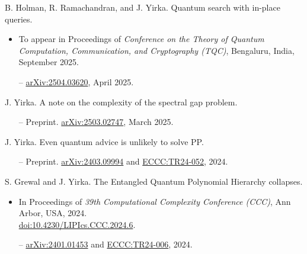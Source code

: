 \documentclass[11pt,letterpaper,serif]{moderncv}
\begin{document}
B. Holman, R. Ramachandran, and J. Yirka.\quad
Quantum search with in-place queries.
\begin{adjustwidth}{.25in}{}
	\begin{itemize}
		\item To appear in Proceedings of \textit{Conference on the Theory of Quantum Computation, Communication, and Cryptography (TQC)}, Bengaluru, India, September 2025.
		\item[--] \href{https://arxiv.org/abs/2504.03620}{arXiv:2504.03620},
		April 2025.
	\end{itemize}
\end{adjustwidth}
\medskip

J. Yirka.\quad
A note on the complexity of the spectral gap problem.
\begin{adjustwidth}{.25in}{}
	\begin{itemize}
		\item[--] Preprint. \href{https://arxiv.org/abs/2503.02747}{arXiv:2503.02747},
		March 2025.
	\end{itemize}
\end{adjustwidth}
\medskip

J. Yirka.\quad
Even quantum advice is unlikely to solve \textup{PP}.
\begin{adjustwidth}{.25in}{}
	\begin{itemize}
		\item[--] Preprint. \href{https://arxiv.org/abs/2403.09994}{arXiv:2403.09994} and \href{https://eccc.weizmann.ac.il/report/2024/052/}{ECCC:TR24-052}, 2024.
	\end{itemize}
\end{adjustwidth}
\medskip

S. Grewal and J. Yirka.\quad
The Entangled Quantum Polynomial Hierarchy collapses.
\begin{adjustwidth}{.25in}{}
	\begin{itemize}
		\item In Proceedings of \textit{39th Computational Complexity Conference (CCC)}, Ann Arbor, USA, 2024.\quad
		\\
		\href{https://doi.org/10.4230/LIPIcs.CCC.2024.6}{doi:10.4230/LIPIcs.CCC.2024.6}.
		\item[--] \href{https://arxiv.org/abs/2401.01453}{arXiv:2401.01453} and \href{https://eccc.weizmann.ac.il/report/2024/006/}{ECCC:TR24-006}, 2024.
	\end{itemize}
\end{adjustwidth}
\medskip
\end{document}
